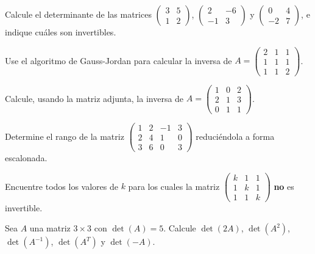 \begin{prob}
Calcule el determinante de las matrices
$\begin{pmatrix}3&5\\1&2\end{pmatrix}$, $\begin{pmatrix}2&-6\\-1&3\end{pmatrix}$ y $\begin{pmatrix}0&4\\-2&7\end{pmatrix}$,
e indique cuáles son invertibles.
\end{prob}

\begin{prob}
Use el algoritmo de Gauss-Jordan para calcular la inversa de $A=\begin{pmatrix}2&1&1\\1&1&1\\1&1&2\end{pmatrix}$.
\end{prob}

\begin{prob}
Calcule, usando la matriz adjunta, la inversa de $A=\begin{pmatrix}1&0&2\\2&1&3\\0&1&1\end{pmatrix}$.
\end{prob}

\begin{prob}
Determine el rango de la matriz $\begin{pmatrix}1&2&-1&3\\2&4&1&0\\3&6&0&3\end{pmatrix}$ reduciéndola a forma escalonada.
\end{prob}

\begin{prob}
Encuentre todos los valores de $k$ para los cuales la matriz $\begin{pmatrix}k&1&1\\1&k&1\\1&1&k\end{pmatrix}$ \textbf{no} es invertible.
\end{prob}

\begin{prob}
Sea $A$ una matriz $3\times 3$ con $\det(A)=5$. Calcule $\det(2A)$, $\det(A^{2})$, $\det(A^{-1})$, $\det(A^{T})$ y $\det(-A)$.
\end{prob}

